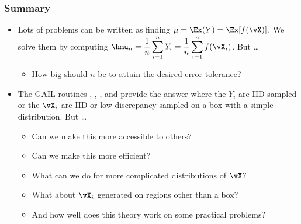 \documentclass[10pt,compress,xcolor={usenames,dvipsnames}]{beamer} %
\begin{document}
\begin{frame}
\frametitle{Summary}
\begin{itemize}
\item Lots of problems can be written as finding $\mu = \Ex(Y) = \Ex[f(\vX)]$.  We solve them by computing $\displaystyle \hmu_n = \frac 1n \sum_{i=1}^n Y_i = \frac{1}{n} \sum_{i=1}^n  f(\vX_i)$.  But \ldots
\begin{itemize} 
\item How big should $n$ be to attain the desired error tolerance?
\end{itemize}

\item The GAIL routines , , , and  provide the answer where the $Y_i$ are IID sampled or the $\vX_i$ are IID or low discrepancy sampled on a box with a simple distribution.  But \ldots
\begin{itemize} 
\item Can we make this more accessible to others?

\item Can we make this more efficient?

\item What can we do for more complicated distributions of $\vX$?

\item What about $\vX_i$ generated on regions other than a box?

\item And how well does  this theory work on some practical problems?
\end{itemize}


\end{itemize}
\end{frame}
\end{document}
